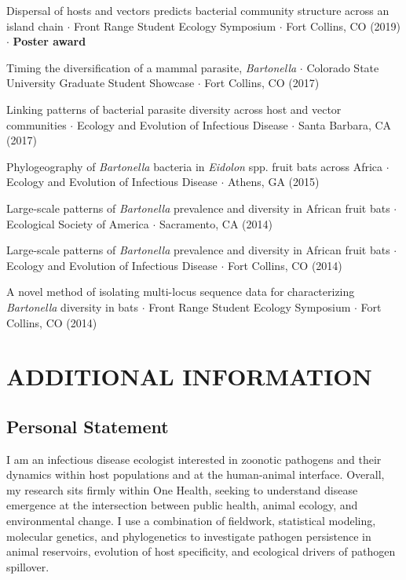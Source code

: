 \documentclass{cv}
\begin{document}
Dispersal of hosts and vectors predicts bacterial community structure across an island chain $\cdot$ Front Range Student Ecology Symposium $\cdot$ Fort Collins, CO (2019) $\cdot$ \textbf{Poster award}

Timing the diversification of a mammal parasite, \textit{Bartonella} $\cdot$ Colorado State University Graduate Student Showcase $\cdot$ Fort Collins, CO (2017)

Linking patterns of bacterial parasite diversity across host and vector communities $\cdot$ Ecology and Evolution of Infectious Disease $\cdot$ Santa Barbara, CA (2017)

Phylogeography of \textit{Bartonella} bacteria in \textit{Eidolon} spp. fruit bats across Africa $\cdot$ Ecology and Evolution of Infectious Disease $\cdot$ Athens, GA (2015)

Large-scale patterns of \textit{Bartonella} prevalence and diversity in African fruit bats $\cdot$ Ecological Society of America $\cdot$ Sacramento, CA (2014)

Large-scale patterns of \textit{Bartonella} prevalence and diversity in African fruit bats $\cdot$ Ecology and Evolution of Infectious Disease $\cdot$ Fort Collins, CO (2014)

A novel method of isolating multi-locus sequence data for characterizing \textit{Bartonella} diversity in bats $\cdot$ Front Range Student Ecology Symposium $\cdot$ Fort Collins, CO (2014)


\section*{ADDITIONAL INFORMATION}

\subsection*{Personal Statement}

I am an infectious disease ecologist interested in zoonotic pathogens and their dynamics within host populations and at the human-animal interface. Overall, my research sits firmly within One Health, seeking to understand disease emergence at the intersection between public health, animal ecology, and environmental change. I use a combination of fieldwork, statistical modeling, molecular genetics, and phylogenetics to investigate pathogen persistence in animal reservoirs, evolution of host specificity, and ecological drivers of pathogen spillover.
\end{document}
